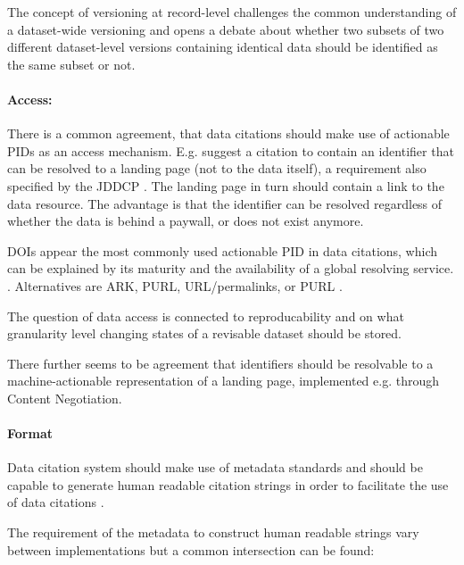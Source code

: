 \documentclass[a4paper,10pt]{article}
\begin{document}
The concept of versioning at record-level challenges the common understanding of a dataset-wide versioning and opens a debate about whether two subsets of two different dataset-level versions containing identical data should be identified as the same subset or not. 


\paragraph{Access:}
There is a common agreement, that data citations should make use of actionable \glspl{PID} as an access mechanism. E.g. \cite{AltKin07} suggest a citation to contain an identifier that can be resolved to a landing page (not to the data itself), a requirement also specified by the \gls{JDDCP} \citep{Fenner2016}.
The landing page in turn should contain a link to the data resource. The advantage is that the identifier can be resolved regardless of whether the data is behind a paywall, or does not exist anymore.

\glspl{DOI} appear the most commonly used actionable \gls{PID} in data citations, which can be explained by its maturity and the availability of a global resolving service.  \citep{Honor2016}. Alternatives are \gls{ARK}, \gls{PURL}, \gls{URL}/permalinks, or \gls{PURL} \citep{Klump2016, Starr2015}.

The question of data access is connected to reproducability and on what granularity level changing states of a revisable dataset should be stored.


There further seems to be agreement that identifiers should be resolvable to a machine-actionable representation of a landing page, implemented e.g. through Content Negotiation.

\paragraph{Format}
Data citation system should make use of metadata standards \citep{CODATA2013} and should be capable to generate human readable citation strings in order to facilitate the use of data citations \citep{Buneman2016, Rauber2015}. 

The requirement of the metadata to construct human readable strings vary between implementations but a common intersection can be found:
\end{document}
